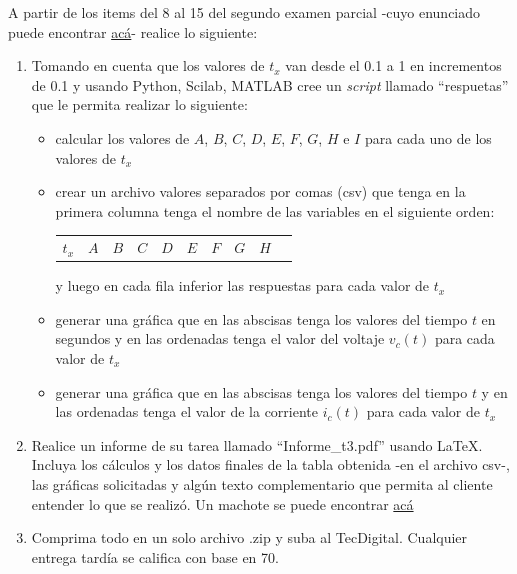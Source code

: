 \documentclass[12pt]{article}
\begin{document}


A partir de los items del 8 al 15 del segundo examen parcial -cuyo enunciado puede encontrar \href{https://estudianteccr-my.sharepoint.com/:b:/g/personal/prof_juan_rojas_estudiantec_cr/Edpreo2lDBdFvutOSz8hA0gBmuoN-8wIpUa2Dnb22-bkQQ}{acá}- realice lo siguiente:
\begin{enumerate}
    \item Tomando en cuenta que los valores de $t_x$ van desde el 0.1 a 1 en incrementos de 0.1 y usando Python, Scilab, MATLAB cree un \emph{script} llamado ``respuetas'' que le permita realizar lo siguiente:
    \begin{itemize}
        \item calcular los valores de $A$, $B$, $C$, $D$, $E$, $F$, $G$, $H$ e $I$ para cada uno de los valores de $t_x$
        \item crear un archivo valores separados por comas (csv) que tenga en la primera columna tenga el nombre de las variables en el siguiente orden: 
        
        \begin{tabular}{cccccccccc}
            $t_x$& $A$& $B$& $C$& $D$& $E$& $F$& $G$& $H$
        \end{tabular}
        
        y luego en cada fila inferior las respuestas para cada valor de $t_x$ 
        \item generar una gráfica que en las abscisas tenga los valores del tiempo $t$ en segundos y en las ordenadas tenga el valor del voltaje $v_c(t)$ para cada valor de $t_x$
        \item generar una gráfica que en las abscisas tenga los valores del tiempo $t$ y en las ordenadas tenga el valor de la corriente $i_c(t)$ para cada valor de $t_x$
    \end{itemize}
    \item Realice un informe de su tarea llamado ``Informe\_t3.pdf'' usando \LaTeX. Incluya los cálculos y los datos finales de la tabla obtenida -en el archivo csv-, las gráficas solicitadas y algún texto complementario que permita al cliente entender lo que se realizó. Un machote se puede encontrar \href{https://www.overleaf.com/read/phnwtckqwqwc}{acá}
    \item Comprima todo en un solo archivo .zip y suba al TecDigital. Cualquier entrega tardía se califica con base en 70.
\end{enumerate}
\end{document}
